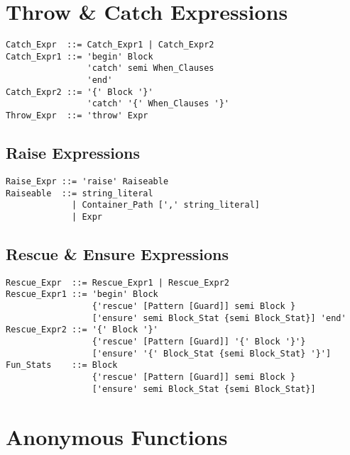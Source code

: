 \section{Throw \& Catch Expressions}

\syntax\begin{lstlisting}
Catch_Expr  ::= Catch_Expr1 | Catch_Expr2
Catch_Expr1 ::= 'begin' Block 
                'catch' semi When_Clauses
                'end'
Catch_Expr2 ::= '{' Block '}'
                'catch' '{' When_Clauses '}'
Throw_Expr  ::= 'throw' Expr
\end{lstlisting}







\subsection{Raise Expressions}

\syntax\begin{lstlisting}
Raise_Expr ::= 'raise' Raiseable
Raiseable  ::= string_literal
             | Container_Path [',' string_literal]
             | Expr
\end{lstlisting}






\subsection{Rescue \& Ensure Expressions}

\syntax\begin{lstlisting}
Rescue_Expr  ::= Rescue_Expr1 | Rescue_Expr2
Rescue_Expr1 ::= 'begin' Block 
                 {'rescue' [Pattern [Guard]] semi Block }
                 ['ensure' semi Block_Stat {semi Block_Stat}] 'end'
Rescue_Expr2 ::= '{' Block '}' 
                 {'rescue' [Pattern [Guard]] '{' Block '}'}
                 ['ensure' '{' Block_Stat {semi Block_Stat} '}']
Fun_Stats    ::= Block
                 {'rescue' [Pattern [Guard]] semi Block }
                 ['ensure' semi Block_Stat {semi Block_Stat}]
\end{lstlisting}






\section{Anonymous Functions}
\label{sec:anonymous-functions}

